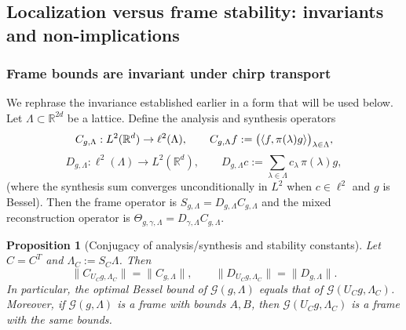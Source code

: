 \documentclass[final,1p,times,authoryear]{elsarticle}
\newtheorem{proposition}[theorem]{Proposition}
\theoremstyle{definition}
\newcommand{\R}{\mathbb{R}}
\newcommand{\1}{\mathbf{1}}
\DeclarePairedDelimiter{\inner}{\langle}{\rangle}
\begin{document}
\subsection{Localization versus frame stability: invariants and non-implications}\label{subsec:local_vs_stability}

\subsubsection{Frame bounds are invariant under chirp transport}
We rephrase the invariance established earlier in a form that will be used below.
Let $\Lambda\subset\R^{2d}$ be a lattice. Define the analysis and synthesis operators
$$
C_{g,\Lambda}:L^2(\R^d)\to \ell^2(\Lambda),
\qquad
C_{g,\Lambda}f:=\big(\inner{f,\pi(\lambda)g}\big)_{\lambda\in\Lambda},
$$
$$
D_{g,\Lambda}:\ell^2(\Lambda)\to L^2(\R^d),
\qquad
D_{g,\Lambda}c:=\sum_{\lambda\in\Lambda} c_\lambda\,\pi(\lambda)g,
$$
(where the synthesis sum converges unconditionally in $L^2$ when $c\in\ell^2$ and $g$ is Bessel).
Then the frame operator is $S_{g,\Lambda}=D_{g,\Lambda}C_{g,\Lambda}$ and the mixed reconstruction operator is
$\Theta_{g,\gamma,\Lambda}=D_{\gamma,\Lambda}C_{g,\Lambda}$.

\begin{proposition}[Conjugacy of analysis/synthesis and stability constants]\label{prop:analysis_synthesis_conjugacy}
Let $C=C^T$ and $\Lambda_C:=S_C\Lambda$. Then
$$
\|C_{U_C g,\Lambda_C}\|=\|C_{g,\Lambda}\|,
\qquad
\|D_{U_C g,\Lambda_C}\|=\|D_{g,\Lambda}\|.
$$
In particular, the optimal Bessel bound of $\mathcal G(g,\Lambda)$ equals that of $\mathcal G(U_C g,\Lambda_C)$.
Moreover, if $\mathcal G(g,\Lambda)$ is a frame with bounds $A,B$, then $\mathcal G(U_C g,\Lambda_C)$ is a frame with the same bounds.
\end{proposition}
\end{document}
